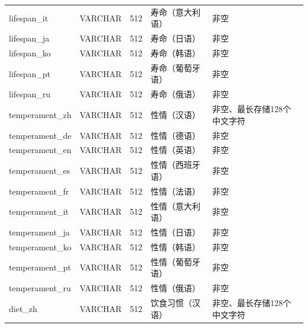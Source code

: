 \begin{longtable}[c]{@{}llrll@{}}
    lifespan\_it             & VARCHAR       & 512         & 寿命（意大利语）     & 非空                                   \\
    lifespan\_ja             & VARCHAR       & 512         & 寿命（日语）       & 非空                                   \\
    lifespan\_ko             & VARCHAR       & 512         & 寿命（韩语）       & 非空                                   \\
    lifespan\_pt             & VARCHAR       & 512         & 寿命（葡萄牙语）     & 非空                                   \\
    lifespan\_ru             & VARCHAR       & 512         & 寿命（俄语）       & 非空                                   \\
    temperament\_zh          & VARCHAR       & 512         & 性情（汉语）       & 非空、最长存储128个中文字符                      \\
    temperament\_de          & VARCHAR       & 512         & 性情（德语）       & 非空                                   \\
    temperament\_en          & VARCHAR       & 512         & 性情（英语）       & 非空                                   \\
    temperament\_es          & VARCHAR       & 512         & 性情（西班牙语）     & 非空                                   \\
    temperament\_fr          & VARCHAR       & 512         & 性情（法语）       & 非空                                   \\
    temperament\_it          & VARCHAR       & 512         & 性情（意大利语）     & 非空                                   \\
    temperament\_ja          & VARCHAR       & 512         & 性情（日语）       & 非空                                   \\
    temperament\_ko          & VARCHAR       & 512         & 性情（韩语）       & 非空                                   \\
    temperament\_pt          & VARCHAR       & 512         & 性情（葡萄牙语）     & 非空                                   \\
    temperament\_ru          & VARCHAR       & 512         & 性情（俄语）       & 非空                                   \\
    diet\_zh                 & VARCHAR       & 512         & 饮食习惯（汉语）     & 非空、最长存储128个中文字符                      \\

\end{longtable}
